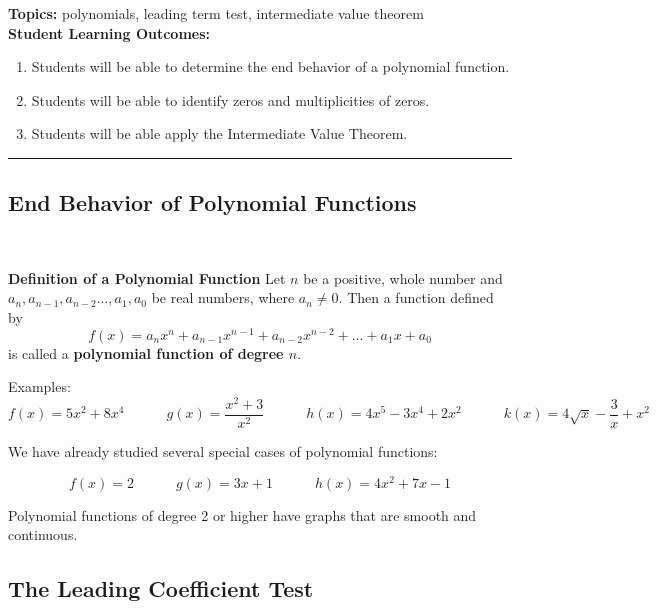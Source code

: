 
\noindent \textbf{Topics:}  polynomials, leading term test, intermediate value theorem\\

\noindent \textbf{Student Learning Outcomes:}
\begin{enumerate}
\item Students will be able to determine the end behavior of a polynomial function.
\item Students will be able to identify zeros and multiplicities of zeros.
\item Students will be able apply the Intermediate Value Theorem.

\end{enumerate}

\hrule 

\bigskip

\subsection{End Behavior of Polynomial Functions} ~

\begin{boxthm}
{\bf Definition of a Polynomial Function}
Let $n$ be a positive, whole number and $a_n,a_{n-1}, a_{n-2}...,a_1,a_0$ be real numbers, where $a_n\neq 0$.  Then a function defined by $$f(x)=a_nx^n+a_{n-1}x^{n-1}+a_{n-2}x^{n-2}+...+a_1x+a_0$$ is called a \textbf{polynomial function of degree $n$}.

\end{boxthm}


Examples:
$$f(x)=5x^2+8x^4 \quad \quad \quad g(x)=\frac{x^2+3}{x^2} \quad \quad \quad  h(x)=4x^5-3x^4+2x^2 \quad \quad \quad k(x)=4\sqrt{x}-\frac{3}{x} +x^2$$

\vfill
We have already studied several special cases of polynomial functions:

$$f(x)=2 \quad \quad \quad g(x)=3x+1 \quad \quad \quad  h(x)=4x^2+7x-1$$


\vfill

Polynomial functions of degree 2 or higher have graphs that are smooth and continuous.\\[.5in]


\clearpage



\subsection{The Leading Coefficient Test}

